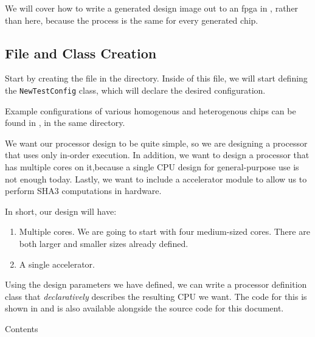 We will cover how to write a generated design image out to an \gls{fpga} in , rather than here, because the process is the same for every generated chip.

\subsection{File and Class Creation}\label{sec:Custom_Config-File_Class}
Start by creating the  file in the  directory.
Inside of this file, we will start defining the \texttt{NewTestConfig} class, which will declare the desired configuration.

\begin{blackbox}
  Example configurations of various homogenous and heterogenous chips can be found in , in the same directory.
\end{blackbox}

We want our processor design to be quite simple, so we are designing a processor that uses only in-order execution.
In addition, we want to design a processor that has multiple cores on it,because a single CPU design for general-purpose use is not enough today.
Lastly, we want to include a  accelerator module to allow us to perform SHA3 computations in hardware.

In short, our design will have:
\begin{enumerate}
\item Multiple  cores.
  We are going to start with four medium-sized cores.
  There are both larger and smaller sizes already defined.
\item A single  accelerator.
\end{enumerate}

Using the design parameters we have defined, we can write a processor definition class that \emph{declaratively} describes the resulting CPU we want.
The code for this is shown in  and is also available alongside the source code for this document.

\begin{listing}[h!tbp]
\caption{ Contents}
\label{lst:Custom_Config-NewTestConfig}
\end{listing}

